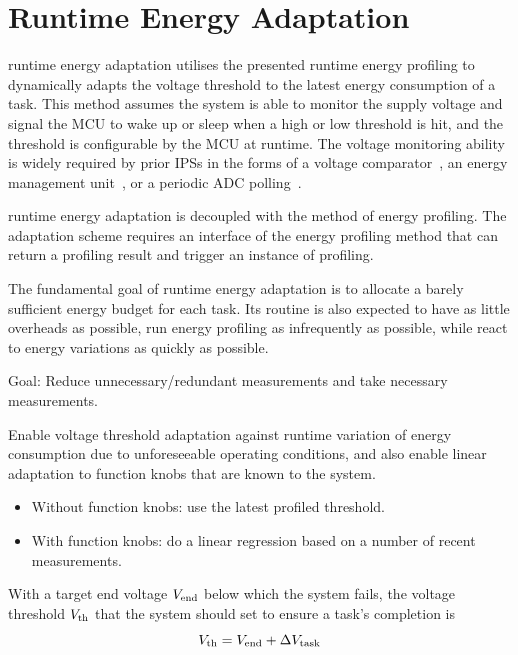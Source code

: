 \section{\nn{} Runtime Energy Adaptation} \label{sec:method2}

\nn{} runtime energy adaptation utilises the presented runtime energy profiling to dynamically adapts the voltage threshold to the latest energy consumption of a task. 
This method assumes the system is able to monitor the supply voltage and signal the MCU to wake up or sleep when a high or low threshold is hit, and the threshold is configurable by the MCU at runtime. 
The voltage monitoring ability is widely required by prior IPSs in the forms of a voltage comparator~\cite{kang2018homerun, balsamo2016hibernus++}, an energy management unit~\cite{gomez2016dynamic, maeng2019supporting}, or a periodic ADC polling~\cite{sliper2019efficient}. 

\nn{} runtime energy adaptation is decoupled with the method of energy profiling. 
The adaptation scheme requires an interface of the energy profiling method that can return a profiling result and trigger an instance of profiling.

The fundamental goal of runtime energy adaptation is to allocate a barely sufficient energy budget for each task. 
Its routine is also expected to have as little overheads as possible, run energy profiling as infrequently as possible, while react to energy variations as quickly as possible.



Goal: Reduce unnecessary/redundant measurements and take necessary measurements.

Enable voltage threshold adaptation against runtime variation of energy consumption due to unforeseeable operating conditions, and also enable linear adaptation to function knobs that are known to the system. 

\begin{itemize}
    \item Without function knobs: use the latest profiled threshold.
    \item With function knobs: do a linear regression based on a number of recent measurements. 
\end{itemize}


With a target end voltage $V_{\text{end}}$ below which the system fails, the voltage threshold $V_{\text{th}}$ that the system should set to ensure a task's completion is
\begin{equation}
    V_{\text{th}} = V_{\text{end}} + \Delta V_{\text{task}}
\end{equation}

